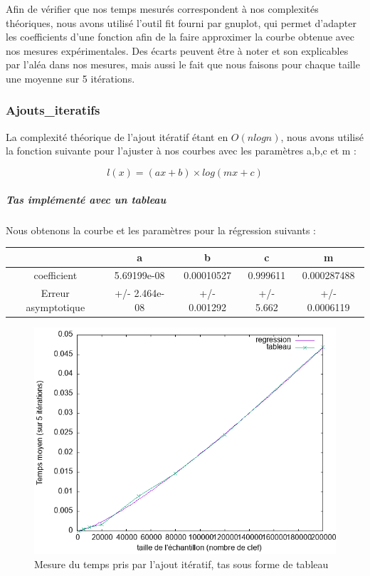 \documentclass[12pt,a4paper]{article}
\begin{document}
Afin de vérifier que nos temps mesurés correspondent à nos complexités théoriques, nous avons utilisé l'outil fit fourni par gnuplot, qui permet d'adapter les coefficients d'une fonction afin de la faire approximer la courbe obtenue avec nos mesures expérimentales. Des écarts peuvent être à noter et son explicables par l'aléa dans nos mesures, mais aussi le fait que nous faisons pour chaque taille une moyenne sur 5 itérations.

\subsubsection{Ajouts\_iteratifs}

La complexité théorique de l'ajout itératif étant en $O(n log n)$, nous avons utilisé la fonction suivante pour l'ajuster à nos courbes avec les paramètres a,b,c et m : 

$$
l(x) = (a x +b) \times log (mx +c)
$$

\subparagraph{Tas implémenté avec un tableau}

Nous obtenons la courbe et les paramètres pour la régression suivants : 

\begin{center}
\begin{tabular}{|c|c|c|c|c|}
\hline
 & a & b & c & m\\
\hline
coefficient & 5.69199e-08 & 0.00010527 & 0.999611 & 0.000287488 \\
Erreur asymptotique & +/- 2.464e-08 & +/- 0.001292 & +/- 5.662  & +/- 0.0006119\\
\hline
\end{tabular}
\end{center}


\begin{figure}[hbtp]
\centering
\includegraphics[scale=0.4]{../Images/svg courbes pour rapport/regression_ajout_iteratif_tab.png}
\caption{Mesure du temps pris par l'ajout itératif, tas sous forme de tableau}
\label{fig1}
\end{figure}
\end{document}
